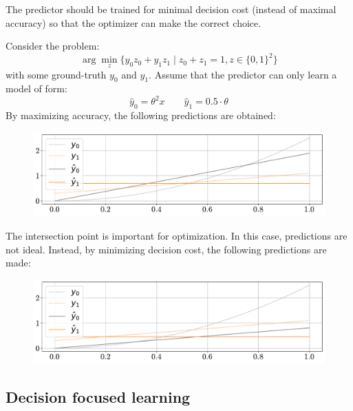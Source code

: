 \begin{description}
        \begin{remark}
            The predictor should be trained for minimal decision cost (instead of maximal accuracy) so that the optimizer can make the correct choice.
        \end{remark}

        \begin{example}
            Consider the problem:
            \[ \arg\min_{z} \{y_0 z_0 + y_1 z_1 \mid z_0 + z_1 = 1, z \in \{0, 1\}^2\} \]
            with some ground-truth $y_0$ and $y_1$.
            Assume that the predictor can only learn a model of form:
            \[ \hat{y}_0 = \theta^2x \qquad \hat{y}_1 = 0.5 \cdot \theta \]
            By maximizing accuracy, the following predictions are obtained:
            \begin{figure}[H]
                \centering
                \includegraphics[width=0.7\linewidth]{./img/_pfl_example1.pdf}
            \end{figure}
            The intersection point is important for optimization. In this case, predictions are not ideal. Instead, by minimizing decision cost, the following predictions are made:
            \begin{figure}[H]
                \centering
                \includegraphics[width=0.7\linewidth]{./img/_pfl_example2.pdf}
            \end{figure}
        \end{example}
\end{description}


\subsection{Decision focused learning}

